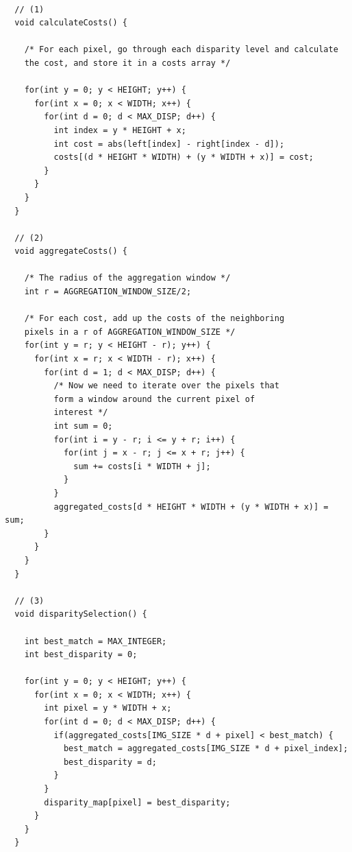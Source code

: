 

\begin{lstlisting}[label={lst:CPU_implementation}, caption=CPU
  implementation of the 3 first steps in the pipeline]

  // (1)
  void calculateCosts() {

    /* For each pixel, go through each disparity level and calculate
    the cost, and store it in a costs array */

    for(int y = 0; y < HEIGHT; y++) {
      for(int x = 0; x < WIDTH; x++) {
        for(int d = 0; d < MAX_DISP; d++) {
          int index = y * HEIGHT + x;
          int cost = abs(left[index] - right[index - d]);
          costs[(d * HEIGHT * WIDTH) + (y * WIDTH + x)] = cost;
        }
      }
    }
  }

  // (2)
  void aggregateCosts() {

    /* The radius of the aggregation window */
    int r = AGGREGATION_WINDOW_SIZE/2;

    /* For each cost, add up the costs of the neighboring
    pixels in a r of AGGREGATION_WINDOW_SIZE */
    for(int y = r; y < HEIGHT - r); y++) {
      for(int x = r; x < WIDTH - r); x++) {
        for(int d = 1; d < MAX_DISP; d++) {
          /* Now we need to iterate over the pixels that
          form a window around the current pixel of
          interest */
          int sum = 0;
          for(int i = y - r; i <= y + r; i++) {
            for(int j = x - r; j <= x + r; j++) {
              sum += costs[i * WIDTH + j];
            }
          }
          aggregated_costs[d * HEIGHT * WIDTH + (y * WIDTH + x)] = sum;
        }
      }
    }
  }

  // (3)
  void disparitySelection() {

    int best_match = MAX_INTEGER;
    int best_disparity = 0;

    for(int y = 0; y < HEIGHT; y++) {
      for(int x = 0; x < WIDTH; x++) {
        int pixel = y * WIDTH + x;
        for(int d = 0; d < MAX_DISP; d++) {
          if(aggregated_costs[IMG_SIZE * d + pixel] < best_match) {
            best_match = aggregated_costs[IMG_SIZE * d + pixel_index];
            best_disparity = d;
          }
        }
        disparity_map[pixel] = best_disparity;
      }
    }
  }
\end{lstlisting}


